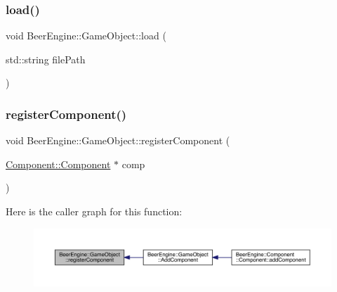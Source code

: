 \subsubsection{\texorpdfstring{load()}{load()}}
{\footnotesize\ttfamily void Beer\+Engine\+::\+Game\+Object\+::load (\begin{DoxyParamCaption}\item[{std\+::string}]{file\+Path }\end{DoxyParamCaption})}

\mbox{\label{class_beer_engine_1_1_game_object_a1454d7ec7fc8d98d621ae9be166976e4}} 
\subsubsection{\texorpdfstring{register\+Component()}{registerComponent()}}
{\footnotesize\ttfamily void Beer\+Engine\+::\+Game\+Object\+::register\+Component (\begin{DoxyParamCaption}\item[{\mbox{\hyperlink{class_beer_engine_1_1_component_1_1_component}{Component\+::\+Component}} $\ast$}]{comp }\end{DoxyParamCaption})\hspace{0.3cm}{\ttfamily [inline]}}

Here is the caller graph for this function\+:
\nopagebreak
\begin{figure}[H]
\begin{center}
\leavevmode
\includegraphics[width=350pt]{class_beer_engine_1_1_game_object_a1454d7ec7fc8d98d621ae9be166976e4_icgraph}
\end{center}
\end{figure}
\mbox{\label{class_beer_engine_1_1_game_object_ac74ff77a1e62e76eff1247c4d3daaa33}} 

